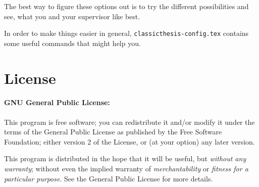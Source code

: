 \noindent The best way to figure these options out is to try the different possibilities and see, what you and your supervisor like best.

In order to make things easier in general, \texttt{classicthesis-config.tex} contains some useful commands that might help you.




\section{License}
\paragraph{GNU General Public License:} This program is free software; you can redistribute it and/or modify it under the terms of the  General Public License as published by the Free Software Foundation; either version 2 of the License, or (at your option) any later version.

This program is distributed in the hope that it will be useful, but \emph{without any warranty}; without even the implied warranty of \emph{merchantability} or \emph{fitness for a particular purpose}. See the  General Public License for more details.